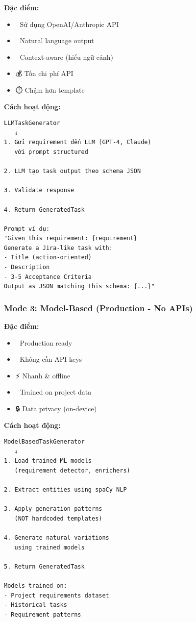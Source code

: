 \documentclass[12pt, a4paper]{report}
\begin{document}
\begin{tcolorbox}[colback=purple!5, colframe=purple!50]
\textbf{Đặc điểm:}
\begin{itemize}
    \item 🤖 Sử dụng OpenAI/Anthropic API
    \item 📝 Natural language output
    \item 🎯 Context-aware (hiểu ngữ cảnh)
    \item 💰 Tốn chi phí API
    \item ⏱️ Chậm hơn template
\end{itemize}

\textbf{Cách hoạt động:}
\begin{lstlisting}
LLMTaskGenerator
   ↓
1. Gửi requirement đến LLM (GPT-4, Claude)
   với prompt structured
   
2. LLM tạo task output theo schema JSON
   
3. Validate response
   
4. Return GeneratedTask

Prompt ví dụ:
"Given this requirement: {requirement}
Generate a Jira-like task with:
- Title (action-oriented)
- Description
- 3-5 Acceptance Criteria
Output as JSON matching this schema: {...}"
\end{lstlisting}
\end{tcolorbox}

\subsubsection{Mode 3: Model-Based (Production - No APIs)}

\begin{tcolorbox}[colback=teal!5, colframe=teal!50]
\textbf{Đặc điểm:}
\begin{itemize}
    \item 🚀 Production ready
    \item 💾 Không cần API keys
    \item ⚡ Nhanh \& offline
    \item 🎯 Trained on project data
    \item 🔒 Data privacy (on-device)
\end{itemize}

\textbf{Cách hoạt động:}
\begin{lstlisting}
ModelBasedTaskGenerator
   ↓
1. Load trained ML models
   (requirement detector, enrichers)
   
2. Extract entities using spaCy NLP
   
3. Apply generation patterns
   (NOT hardcoded templates)
   
4. Generate natural variations
   using trained models
   
5. Return GeneratedTask

Models trained on:
- Project requirements dataset
- Historical tasks
- Requirement patterns
\end{lstlisting}
\end{tcolorbox}
\end{document}
